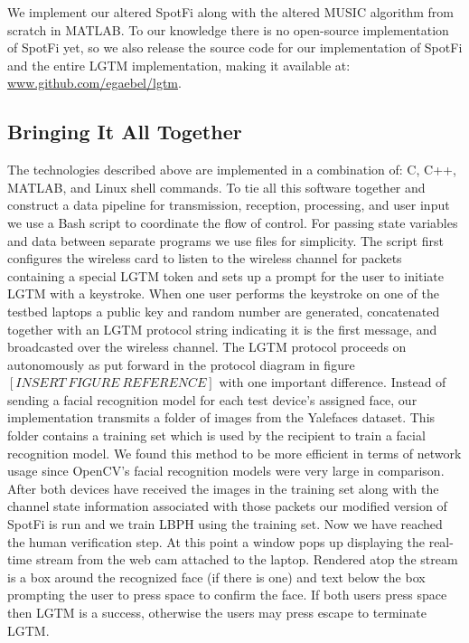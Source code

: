 \documentclass[12pt]{report}
\begin{document}
We implement our altered SpotFi along with the altered MUSIC algorithm from scratch in MATLAB. To our knowledge there is no open-source implementation of SpotFi yet, so we also release the source code for our implementation of SpotFi and the entire LGTM implementation, making it available at: \url{www.github.com/egaebel/lgtm}. \par

\subsection{Bringing It All Together}
The technologies described above are implemented in a combination of: C, C++, MATLAB, and Linux shell commands. To tie all this software together and construct a data pipeline for transmission, reception, processing, and user input we use a Bash script to coordinate the flow of control. For passing state variables and data between separate programs we use files for simplicity. The script first configures the wireless card to listen to the wireless channel for packets containing a special LGTM token and sets up a prompt for the user to initiate LGTM with a keystroke. When one user performs the keystroke on one of the testbed laptops a public key and random number are generated, concatenated together with an LGTM protocol string indicating it is the first message, and broadcasted over the wireless channel. The LGTM protocol proceeds on autonomously as put forward in the protocol diagram in figure $[INSERT \: FIGURE \: REFERENCE]$ with one important difference. Instead of sending a facial recognition model for each test device's assigned face, our implementation transmits a folder of images from the Yalefaces dataset. This folder contains a training set which is used by the recipient to train a facial recognition model. We found this method to be more efficient in terms of network usage since OpenCV's facial recognition models were very large in comparison. After both devices have received the images in the training set along with the channel state information associated with those packets our modified version of SpotFi is run and we train LBPH using the training set. Now we have reached the human verification step. At this point a window pops up displaying the real-time stream from the web cam attached to the laptop. Rendered atop the stream is a box around the recognized face (if there is one) and text below the box prompting the user to press space to confirm the face. If both users press space then LGTM is a success, otherwise the users may press escape to terminate LGTM. \par
\end{document}
